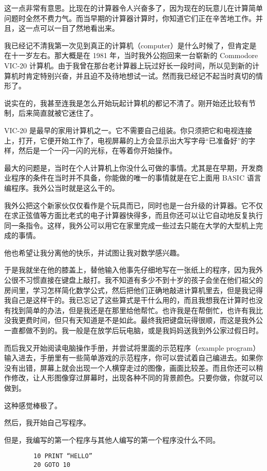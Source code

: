 这一点非常有意思。比现在的计算器令人兴奋多了，因为现在的玩意儿在计算简单问题时全然不费力气。而当早期的计算器计算时，你知道它们正在辛苦地工作。并且，这一点可以一目了然地看出来。

我已经记不清我第一次见到真正的计算机（computer）是什么时候了，但肯定是在十一岁左右。那大概是在 1981 年，当时我外公抱回来一台崭新的 Commodore VIC-20 计算机。由于我曾在那台老计算器上玩过好长一段时间，所以见到新的计算机时肯定特别兴奋，并且迫不及待地想试一试。然而我已经记不起当时真切的情形了。

说实在的，我甚至连我是怎么开始玩起计算机的都记不清了。刚开始还比较有节制，后来简直就被它迷住了。

VIC-20 是最早的家用计算机之一。它不需要自己组装。你只须把它和电视连接上，打开，它便开始工作了，电视屏幕的上方会显示出大写字母“已准备好”的字样，然后是一个一闪一闪的光标，在等着你开始操作。

最大的问题是，当时在个人计算机上你没什么可做的事情。尤其是在早期，开发商业程序的条件在当时并不具备，你能做的唯一的事情就是在它上面用 BASIC 语言编程序。我外公当时就是这么干的。

我外公把这个新家伙仅仅看作是个玩具而已，同时也是一台升级的计算器。它不仅在求正弦值等方面比老式的电子计算器快得多，而且你还可以让它自动地反复执行同一条指令。这样，我外公可以用它在家里完成一些过去只能在大学的大型机上完成的事情。

他也希望让我分离他的快乐，并试图让我对数学感兴趣。

于是我就坐在他的膝盖上，替他输入他事先仔细地写在一张纸上的程序，因为我外公很不习惯直接在键盘上敲打。我不知道有多少不到十岁的孩子会坐在他们祖父的房间里，学习怎样简化数学公式，然后把他们正确地敲进计算机里去，但是我记得我自己是这样干的。我已忘记了这些算式是干什么用的，而且我想我在计算时也没有找到简单的办法，但是我还是在那里给他帮忙。也许我是在帮倒忙，也许有我比没我更费时间，但只有天知道是不是如此。最终我把键盘玩得很顺，而这是我外公一直都做不到的。我一般是在放学后玩电脑，或是我妈妈送我到外公家过假日时。

而后我又开始阅读电脑操作手册，并尝试将里面的示范程序（example program）输入进去，手册里有一些简单游戏的示范程序，你可以尝试着自己编进去。如果你没有出错，屏幕上就会出现一个人横穿走过的图像，画面比较差。而且你还可以稍作修改，让人形图像穿过屏幕时，出现各种不同的背景颜色。只要你做，你就可以做到。

这种感觉棒极了。

然后，我开始自己写程序。

但是，我编写的第一个程序与其他人编写的第一个程序没什么不同。
\begin{verbatim}
        10 PRINT “HELLO”
        20 GOTO 10
\end{verbatim}

